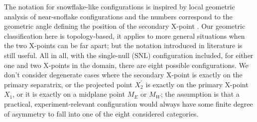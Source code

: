 The notation for snowflake-like configurations is inspired by local
geometric analysis of near-snoflake configurations and the numbers
correspond to the geometric angle defining the position of the
secondary X-point \cite{Ryutov2010}. Our geometric classification here
is topology-based, it applies to more general situations when the two
X-points can be far apart; but the notation introduced in literature\cite{Ryutov2010} is still useful. All in all, with the
single-null (SNL) configuration included, for either one and two
X-points in the domain, there are eight possible configurations. We
don't consider degenerate cases where the secondary X-point is exactly
on the primary separatrix, or the projected point $X^{\prime}_2$ is
exactly on the primary X-point $X_1$, or it is exactly on a midplane
point $M_E$ or $M_W$; the assumption is that a practical, experiment-relevant configuration
would always have some finite degree of asymmetry to fall into one of
the eight considered categories.
